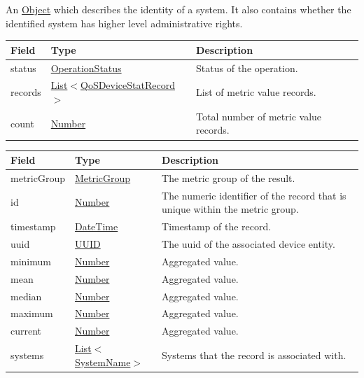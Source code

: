 \documentclass[a4paper]{arrowhead}
\newcommand{\pref}[1]{{\textcolor{ArrowheadGrey}{\hyperref[sec:model:primitives:#1]{#1}}}}
\begin{document}

An \pref{Object} which describes the identity of a system. It also contains whether the identified system has higher level administrative rights.

\clearpage


\begin{table}[ht!]
\begin{tabularx}{\textwidth}{| p{3cm} | p{6.5cm} | X |} \hline
\rowcolor{gray!33} Field & Type & Description \\ \hline
status & \pref{OperationStatus} & Status of the operation. \\ \hline
records & \pref{List}$<$\hyperref[sec:model:QoSDeviceStatRecord]{QoSDeviceStatRecord}$>$ & List of metric value records. \\ \hline
count & \pref{Number} & Total number of metric value records. \\ \hline
\end{tabularx}
\end{table}


\begin{table}[ht!]
\begin{tabularx}{\textwidth}{| p{2.8cm} | p{4.5cm} | X |} \hline
\rowcolor{gray!33} Field & Type & Description \\ \hline
metricGroup & \pref{MetricGroup} & The metric group of the result. \\ \hline
id & \pref{Number} & The numeric identifier of the record that is unique within the metric group. \\ \hline
timestamp & \pref{DateTime} & Timestamp of the record. \\ \hline
uuid & \pref{UUID} & The uuid of the associated device entity. \\ \hline
minimum & \pref{Number} & Aggregated value. \\ \hline
mean & \pref{Number} & Aggregated value. \\ \hline
median & \pref{Number} & Aggregated value. \\ \hline
maximum & \pref{Number} & Aggregated value. \\ \hline
current & \pref{Number} & Aggregated value. \\ \hline
systems & \pref{List}$<$\pref{SystemName}$>$ & Systems that the record is associated with. \\ \hline
\end{tabularx}
\end{table}
\end{document}
